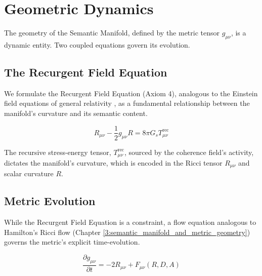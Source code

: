
\section{Geometric Dynamics}
\label{10.3:geometric_dynamics}

The geometry of the Semantic Manifold, defined by the metric tensor \(g_{\mu\nu}\), is a dynamic entity. Two coupled equations govern its evolution.


\subsection{The Recurgent Field Equation}
\label{10.3.1:the_recurgent_field_equation}

We formulate the Recurgent Field Equation (Axiom 4), analogous to the Einstein field equations of general relativity \autocite{Einstein1915}, as a fundamental relationship between the manifold's curvature and its semantic content.

\begin{equation}
R_{\mu\nu} - \frac{1}{2}g_{\mu\nu}R = 8\pi G_s T^{\text{rec}}_{\mu\nu}
\end{equation}

The recursive stress-energy tensor, \(T^{\text{rec}}_{\mu\nu}\), sourced by the coherence field's activity, dictates the manifold's curvature, which is encoded in the Ricci tensor \(R_{\mu\nu}\) and scalar curvature \(R\).


\subsection{Metric Evolution}
\label{10.3.2:metric_evolution}

While the Recurgent Field Equation is a constraint, a flow equation analogous to Hamilton's Ricci flow (Chapter \ref{3:semantic_manifold_and_metric_geometry}) \autocite{Hamilton1982} governs the metric's explicit time-evolution.

\begin{equation}
\frac{\partial g_{\mu\nu}}{\partial t} = -2 R_{\mu\nu} + F_{\mu\nu}(R, D, A)
\end{equation}

